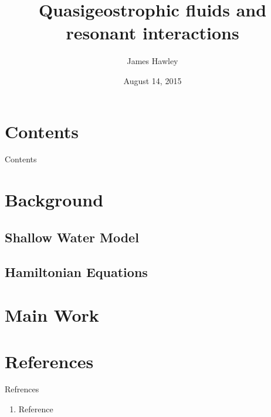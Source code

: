 \documentclass{beamer}
\title{Quasigeostrophic fluids and resonant interactions}
\author{James Hawley}
\date{August 14, 2015}
\institute{University of Waterloo}
\begin{document}
	\begin{frame}
		\titlepage
	\end{frame}

	\section*{Contents}
		\begin{frame}{Contents}
			\tableofcontents
		\end{frame}

	\section{Background}
		\subsection{Shallow Water Model}
		\subsection{Hamiltonian Equations}

	\section{Main Work}

	\section{References}
		\begin{frame}{Refrences}
			\begin{enumerate}
				\item Reference
			\end{enumerate}
		\end{frame}
\end{document}
